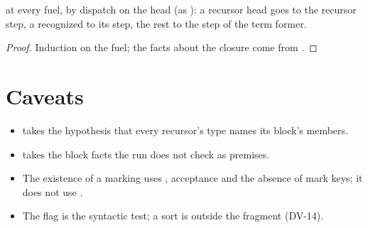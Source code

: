 \begin{lemma}
  \label{lem:EraseProof-Steps-existsSpec_of}
  \leanok
    at every fuel, by dispatch on the head (as ): a recursor head goes to the recursor step, a recognized  to its step, the rest to the step of the term former.
\end{lemma}
\begin{proof}
  \leanok
   Induction on the fuel; the facts about the closure come from .
\end{proof}

\section*{Caveats}
\begin{itemize}
\item {} takes the hypothesis that every recursor's type names its block's members.
\item {} takes the block facts the run does not check as premises.
\item The existence of a marking uses , acceptance and the absence of mark keys; it does not use .
\item The  flag is the syntactic test; a sort  is outside the fragment (DV-14).
\end{itemize}
